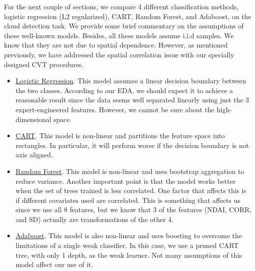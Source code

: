 \documentclass[11pt, letterpaper, journal]{IEEEtran}
\begin{document}
For the next couple of sections, we compare 4 different classification methods, logistic regression (L2 regularized), CART, Random Forest, and Adaboost, on the cloud detection task. We provide some brief commentary on the assumptions of these well-known models. Besides, all these models assume i.i.d samples. We know that they are not due to spatial dependence. However, as mentioned previously, we have addressed the spatial correlation issue with our specially designed CVT procedures. 
\begin{itemize}
    \item \underline{Logistic Regression}. This model assumes a linear decision boundary between the two classes. According to our EDA, we should expect it to achieve a reasonable result since the data seems well separated linearly using just the 3 expert-engineered features. However, we cannot be sure about the high-dimensional space.
    \item \underline{CART}. This model is non-linear and partitions the feature space into rectangles. In particular, it will perform worse if the decision boundary is not axis aligned. 
    \item \underline{Random Forest}. This model is non-linear and uses bootstrap aggregation to reduce variance. Another important point is that the model works better when the set of trees trained is less correlated. One factor that affects this is if different covariates used are correlated. This is something that affects us since we use all 8 features, but we know that 3 of the features (NDAI, CORR, and SD) actually are transformations of the other 4.
    \item \underline{Adaboost}. This model is also non-linear and uses boosting to overcome the limitations of a single weak classifier. In this case, we use a pruned CART tree, with only 1 depth, as the weak learner. Not many assumptions of this model affect our use of it.
\end{itemize}
\end{document}
